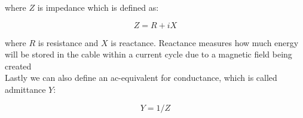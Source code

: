 where $Z$ is impedance which is defined as:

\begin{equation}
    Z = R + iX
    \label{eq:ac:impedance}
\end{equation}

where $R$ is resistance and $X$ is reactance. Reactance measures how much
energy will be stored in the cable within a current cycle due to a magnetic
field being created\\

Lastly we can also define an ac-equivalent for conductance, which is called admittance $Y$:

\begin{equation}
    Y = 1/Z
    \label{eq:ac:admittance}
\end{equation}